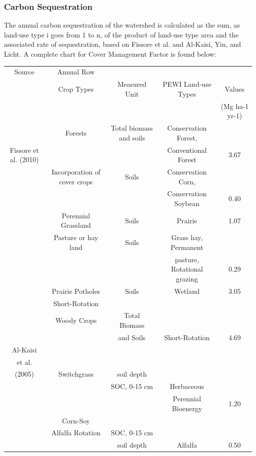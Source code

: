 \documentclass[11pt]{article}
\begin{document}
\subsubsection{Carbon Sequestration}
The annual carbon sequestration of the watershed is calculated as the sum, as land-use type i goes from 1 to n, of the product of land-use type area and the associated rate of sequestration, based on Fissore et al. and Al-Kaisi, Yin, and Licht.\cite{37} 
A complete chart for Cover Management Factor is found below:
\begin{center}
\begin{tabular}{ |c|c|c|c|c| } 
\hline
Source & Annual Row\\
& Crop Types & Measured Unit & PEWI Land-use Types
& Values \\
& & & & (Mg ha-1 yr-1) \\
\hline
\multirow{3}{3em}{Fissore et al. (2010)} & Forests & Total biomass and soils & Conservation Forest, \\
& & & Conventional Forest & 3.67 \\ 

& Incorporation of cover crops 
& Soils & Conservation Corn, \\
& & & Conservation Soybean & 0.40\\ 
\hline

& Perennial Grassland 
& Soils & Prairie & 1.07\\ 
\hline

& Pasture or hay land 
& Soils & Grass hay, Permanent \\
& & &  pasture, Rotational grazing & 0.29\\
\hline

& Prairie Potholes
& Soils & Wetland & 3.05\\
\hline

& Short-Rotation \\
& Woody Crops & Total Biomass \\
& & and Soils & Short-Rotation & 4.69 \\
\hline
 
Al-Kaisi \\
et al.\\
(2005) & Switchgrass & soil depth \\ [-0.42 in]
& & SOC, 0-15 cm & Herbaceous\\
& & & Perennial Bioenergy & 1.20 \\
\hline

& Corn-Soy \\
& Alfalfa Rotation & SOC, 0-15 cm \\
& & soil depth & Alfalfa & 0.50 \\
\hline
\end{tabular}
\end{center}
 
\end{document}
